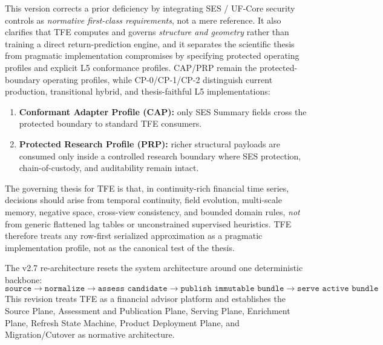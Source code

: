 \documentclass[11pt]{report}
\begin{document}
This version corrects a prior deficiency by integrating SES / UF-Core security controls as \emph{normative first-class requirements}, not a mere reference. It also clarifies that TFE computes and governs \emph{structure and geometry} rather than training a direct return-prediction engine, and it separates the scientific thesis from pragmatic implementation compromises by specifying protected operating profiles and explicit L5 conformance profiles. CAP/PRP remain the protected-boundary operating profiles, while CP-0/CP-1/CP-2 distinguish current production, transitional hybrid, and thesis-faithful L5 implementations:
\begin{enumerate}[leftmargin=1.2cm]
    \item \textbf{Conformant Adapter Profile (CAP):} only SES Summary fields cross the protected boundary to standard TFE consumers.
    \item \textbf{Protected Research Profile (PRP):} richer structural payloads are consumed only inside a controlled research boundary where SES protection, chain-of-custody, and auditability remain intact.
\end{enumerate}

The governing thesis for TFE is that, in continuity-rich financial time series, decisions should arise from temporal continuity, field evolution, multi-scale memory, negative space, cross-view consistency, and bounded domain rules, \emph{not} from generic flattened lag tables or unconstrained supervised heuristics. TFE therefore treats any row-first serialized approximation as a pragmatic implementation profile, not as the canonical test of the thesis.

The v2.7 re-architecture resets the system architecture around one deterministic backbone:
\[
\texttt{source} \rightarrow \texttt{normalize} \rightarrow \texttt{assess candidate} \rightarrow \texttt{publish immutable bundle} \rightarrow \texttt{serve active bundle}
\]
This revision treats TFE as a financial advisor platform and establishes the Source Plane, Assessment and Publication Plane, Serving Plane, Enrichment Plane, Refresh State Machine, Product Deployment Plane, and Migration/Cutover as normative architecture.
\end{document}
